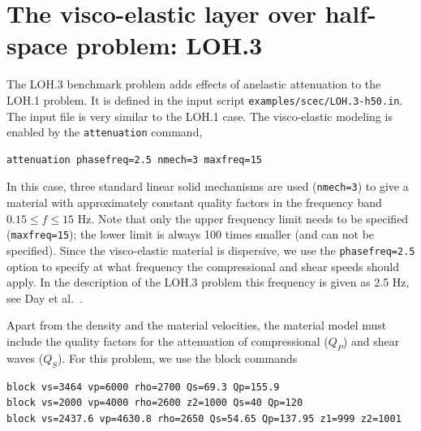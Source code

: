 \documentclass[11pt]{report}
\begin{document}
\section{The visco-elastic layer over half-space problem: LOH.3}
The LOH.3 benchmark problem adds effects of anelastic attenuation to the LOH.1 problem. It is
defined in the input script \verb+examples/scec/LOH.3-h50.in+. The input file is very similar to the
LOH.1 case. The visco-elastic modeling is enabled by the \verb+attenuation+ command,
\begin{verbatim}
attenuation phasefreq=2.5 nmech=3 maxfreq=15
\end{verbatim}
In this case, three standard linear solid mechanisms are used (\verb+nmech=3+) to give a material
with approximately constant quality factors in the frequency band $0.15 \leq f \leq 15$ Hz. Note
that only the upper frequency limit needs to be specified (\verb+maxfreq=15+); the lower limit is
always 100 times smaller (and can not be specified). Since the visco-elastic material is dispersive,
we use the \verb+phasefreq=2.5+ option to specify at what frequency the compressional and shear
speeds should apply. In the description of the LOH.3 problem this frequency is given as 2.5 Hz, see
Day et al.~\cite{Day-2003}.

Apart from the density and the material velocities, the material model must include the quality
factors for the attenuation of compressional ($Q_P$) and shear waves ($Q_S$). For this problem, we
use the block commands
\begin{verbatim}
block vs=3464 vp=6000 rho=2700 Qs=69.3 Qp=155.9
block vs=2000 vp=4000 rho=2600 z2=1000 Qs=40 Qp=120
block vs=2437.6 vp=4630.8 rho=2650 Qs=54.65 Qp=137.95 z1=999 z2=1001
\end{verbatim}
\end{document}
